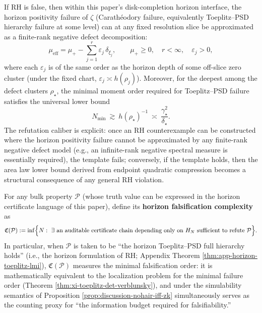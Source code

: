 \begin{conjecture}\label{conj:discussion-finite-rank-negative-defect}
If RH is false, then within this paper's disk-completion horizon interface, the horizon positivity failure of \(\zeta\) (Carath\'eodory failure, equivalently Toeplitz--PSD hierarchy failure at some level) can at any fixed resolution slice be approximated as a finite-rank negative defect decomposition:
\[
\mu_{\mathrm{eff}}=\mu_+ - \sum_{j=1}^r \varepsilon_j\,\delta_{\xi_j},
\qquad
\mu_+\ge 0,\quad r<\infty,\quad \varepsilon_j>0,
\]
where each \(\varepsilon_j\) is of the same order as the horizon depth of some off-slice zero cluster (under the fixed chart, \(\varepsilon_j\asymp h(\rho_j)\)).
Moreover, for the deepest among the defect clusters \(\rho_\star\), the minimal moment order required for Toeplitz--PSD failure satisfies the universal lower bound
\[
N_{\min}\ \gtrsim\ h(\rho_\star)^{-1}\ \asymp\ \frac{\gamma_\star^2}{\delta_\star}.
\]
The refutation caliber is explicit: once an RH counterexample can be constructed where the horizon positivity failure cannot be approximated by any finite-rank negative defect model (e.g., an infinite-rank negative spectral measure is essentially required), the template fails; conversely, if the template holds, then the area law lower bound derived from endpoint quadratic compression becomes a structural consequence of any general RH violation.
\end{conjecture}

\begin{definition}\label{def:discussion-horizon-falsification-complexity}
For any bulk property \(\mathcal{P}\) (whose truth value can be expressed in the horizon certificate language of this paper), define its \textbf{horizon falsification complexity} as
\[
\mathfrak{C}(\mathcal{P})
:=\inf\Bigl\{N:\ \exists\ \text{an auditable certificate chain depending only on }H_N\text{ sufficient to refute }\mathcal{P}\Bigr\}.
\]
In particular, when \(\mathcal{P}\) is taken to be ``the horizon Toeplitz--PSD full hierarchy holds'' (i.e., the horizon formulation of RH; Appendix Theorem \ref{thm:app-horizon-toeplitz-lmi}), \(\mathfrak{C}(\mathcal{P})\) measures the minimal falsification order: it is mathematically equivalent to the localization problem for the minimal failure order (Theorem \ref{thm:xi-toeplitz-det-verblunsky}), and under the simulability semantics of Proposition \ref{prop:discussion-nohair-iff-zk} simultaneously serves as the counting proxy for ``the information budget required for falsifiability.''
\end{definition}

\endinput
